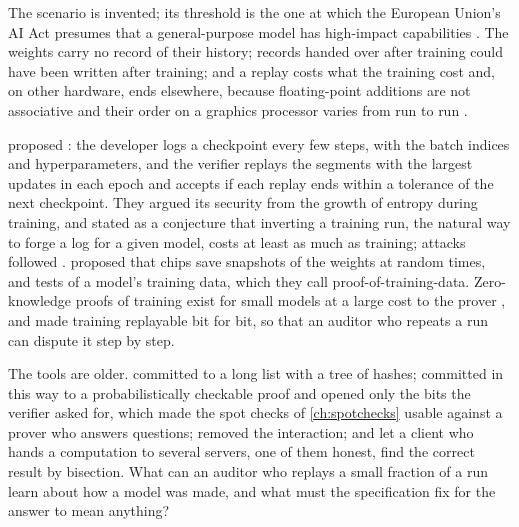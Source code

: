 \begin{refsection}
The scenario is invented; its threshold is the one at which the European Union's AI Act presumes that a general-purpose model has high-impact capabilities \parencite[Art.~51(2)]{EU2024AIAct}. The weights carry no record of their history; records handed over after training could have been written after training; and a replay costs what the training cost and, on other hardware, ends elsewhere, because floating-point additions are not associative and their order on a graphics processor varies from run to run \parencite{JiaEtAl2021,SrivastavaAroraBoneh2024}.

\Textcite{JiaEtAl2021} proposed : the developer logs a checkpoint every few steps, with the batch indices and hyperparameters, and the verifier replays the segments with the largest updates in each epoch and accepts if each replay ends within a tolerance of the next checkpoint. They argued its security from the growth of entropy during training, and stated as a conjecture that inverting a training run, the natural way to forge a log for a given model, costs at least as much as training; attacks followed \parencite{ZhangEtAl2022,FangEtAl2023}. \Textcite{Shavit2023} proposed that chips save snapshots of the weights at random times, and \textcite{ChoiShavitDuvenaud2023} tests of a model's training data, which they call proof-of-training-data. Zero-knowledge proofs of training exist for small models at a large cost to the prover \parencite{GargEtAl2023,AbbaszadehEtAl2024}, and \textcite{SrivastavaAroraBoneh2024} made training replayable bit for bit, so that an auditor who repeats a run can dispute it step by step.

The tools are older. \Textcite{Merkle1987} committed to a long list with a tree of hashes; \textcite{Kilian1992} committed in this way to a probabilistically checkable proof and opened only the bits the verifier asked for, which made the spot checks of \cref{ch:spotchecks} usable against a prover who answers questions; \textcite{Micali2000} removed the interaction; and \textcite{CanettiRivaRothblum2011} let a client who hands a computation to several servers, one of them honest, find the correct result by bisection. What can an auditor who replays a small fraction of a run learn about how a model was made, and what must the specification fix for the answer to mean anything?


\end{refsection}
